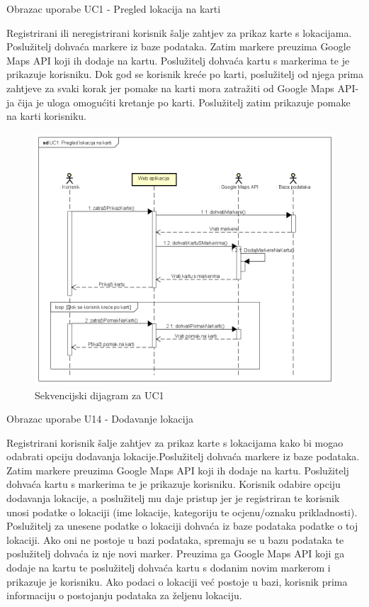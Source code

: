 				Obrazac uporabe UC1 - Pregled lokacija na karti

				Registrirani ili neregistrirani korisnik šalje zahtjev za prikaz karte s lokacijama. Poslužitelj dohvaća markere iz baze podataka.
				Zatim markere preuzima Google Maps API koji ih dodaje na kartu. Poslužitelj dohvaća kartu s markerima te je prikazuje korisniku.
				Dok god se korisnik kreće po karti, poslužitelj od njega prima zahtjeve za svaki korak jer pomake na karti mora zatražiti od 
				Google Maps API-ja čija je uloga omogućiti kretanje po karti. Poslužitelj zatim prikazuje pomake na karti korisniku. 
				
				\begin{figure}[H]
					\includegraphics[scale=0.63]{slike/SekvencijskiDijagram1.png}
					\centering
					\caption{Sekvencijski dijagram za UC1}
					\label{fig:promjene}
				\end{figure}

				Obrazac uporabe U14 - Dodavanje lokacija

				Registrirani korisnik šalje zahtjev za prikaz karte s lokacijama kako bi mogao odabrati opciju dodavanja lokacije.Poslužitelj dohvaća markere iz baze podataka.
				Zatim markere preuzima Google Maps API koji ih dodaje na kartu. Poslužitelj dohvaća kartu s markerima te je prikazuje korisniku. Korisnik odabire opciju dodavanja
				lokacije, a poslužitelj mu daje pristup jer je registriran te korisnik unosi podatke o lokaciji (ime lokacije, kategoriju te ocjenu/oznaku prikladnosti). Poslužitelj 
				za unesene podatke o lokaciji dohvaća iz baze podataka podatke o toj lokaciji. Ako oni ne postoje u bazi podataka, spremaju se u bazu podataka te poslužitelj dohvaća 
				iz nje novi marker. Preuzima ga Google Maps API koji ga dodaje na kartu te poslužitelj dohvaća kartu s dodanim novim markerom i prikazuje je korisniku. Ako podaci o
				lokaciji već postoje u bazi, korisnik prima informaciju o postojanju podataka za željenu lokaciju.
				
